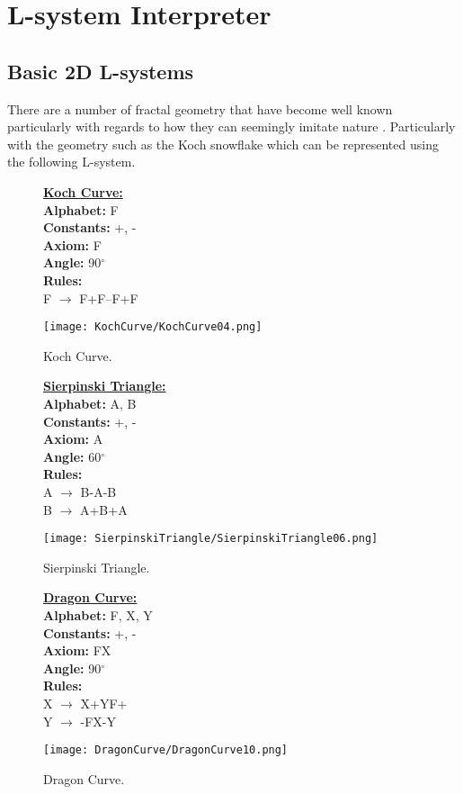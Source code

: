\section{L-system Interpreter}

\subsection{Basic 2D L-systems} 

There are a number of fractal geometry that have become well known particularly with regards to how they can seemingly imitate nature \cite{mandelbrot1982fractal}. Particularly with the geometry such as the Koch snowflake which can be represented using the following L-system.

\begin{figure}[htbp]
	\raggedright
	\textbf{\underline{Koch Curve:}} \\
	\textbf{Alphabet:} F \\
	\textbf{Constants:} +, - \\
	\textbf{Axiom:} F \\
	\textbf{Angle:} 90$^\circ$ \\
	\textbf{Rules:} \\
	F $\rightarrow$ F+F--F+F\\
	{\centering
		\vspace{7px}
		\texttt{[image: KochCurve/KochCurve04.png]}
		\caption{Koch Curve.}
	}
\end{figure}
\begin{figure}[htbp]
	\raggedright
	\textbf{\underline{Sierpinski Triangle:}} \\
	\textbf{Alphabet:} A, B \\
	\textbf{Constants:} +, - \\
	\textbf{Axiom:} A \\
	\textbf{Angle:} 60$^\circ$ \\
	\textbf{Rules:} \\
	A $\rightarrow$  B-A-B \\
	B $\rightarrow$ A+B+A\\
	{\centering
		\vspace{7px}
		\texttt{[image: SierpinskiTriangle/SierpinskiTriangle06.png]}
		\caption{Sierpinski Triangle.}
	}
\end{figure}
\begin{figure}[htbp]
	\raggedright
	\textbf{\underline{Dragon Curve:}} \\
	\textbf{Alphabet:} F, X, Y \\
	\textbf{Constants:} +, - \\
	\textbf{Axiom:} FX \\
	\textbf{Angle:} 90$^\circ$ \\
	\textbf{Rules:} \\
	X $\rightarrow$ X+YF+ \\
	Y $\rightarrow$ -FX-Y\\
	{\centering
		\vspace{7px}
		\texttt{[image: DragonCurve/DragonCurve10.png]}
		\caption{Dragon Curve.}
	}
\end{figure}
